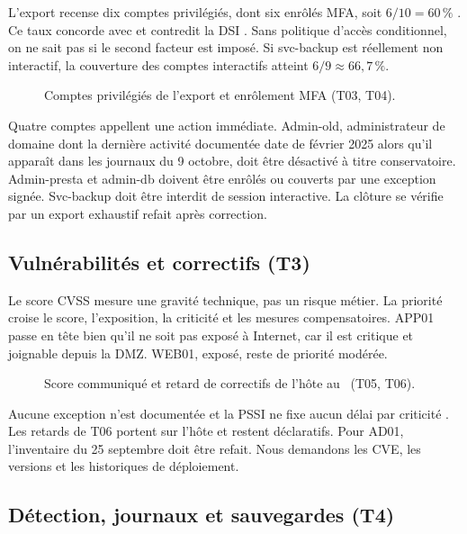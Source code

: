 L'export recense dix comptes privilégiés, dont six enrôlés MFA, soit $6/10 = 60\,\%$ . Ce taux concorde avec  et contredit la DSI . Sans politique d'accès conditionnel, on ne sait pas si le second facteur est imposé. Si svc-backup est réellement non interactif, la couverture des comptes interactifs atteint $6/9 \approx 66{,}7\,\%$.

\begin{figure}[H]
\centering
\resizebox{0.92\linewidth}{!}{}
\caption{Comptes privilégiés de l'export et enrôlement MFA (T03, T04).}
\end{figure}

Quatre comptes appellent une action immédiate. Admin-old, administrateur de domaine dont la dernière activité documentée date de février 2025 alors qu'il apparaît dans les journaux du 9 octobre, doit être désactivé à titre conservatoire. Admin-presta et admin-db doivent être enrôlés ou couverts par une exception signée. Svc-backup doit être interdit de session interactive. La clôture se vérifie par un export exhaustif refait après correction.

\subsection{Vulnérabilités et correctifs (T3)}

Le score CVSS mesure une gravité technique, pas un risque métier. La priorité croise le score, l'exposition, la criticité et les mesures compensatoires. APP01 passe en tête bien qu'il ne soit pas exposé à Internet, car il est critique et joignable depuis la DMZ. WEB01, exposé, reste de priorité modérée.

\begin{figure}[H]
\centering

\caption{Score communiqué et retard de correctifs de l'hôte au \DateReference\ (T05, T06).}
\end{figure}

Aucune exception n'est documentée et la PSSI ne fixe aucun délai par criticité . Les retards de T06 portent sur l'hôte et restent déclaratifs. Pour AD01, l'inventaire du 25 septembre doit être refait. Nous demandons les CVE, les versions et les historiques de déploiement.

\subsection{Détection, journaux et sauvegardes (T4)}

